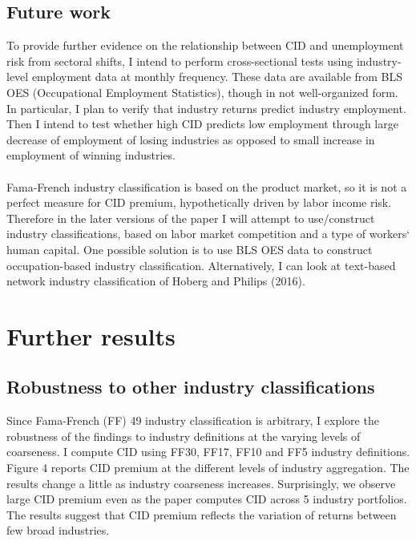 \documentclass[12pt]{article}
\begin{document}
\subsection{Future work}

To provide further evidence on the relationship between CID and unemployment risk from sectoral shifts, I intend to perform cross-sectional tests using industry-level employment data at monthly frequency. These data are available from BLS OES (Occupational Employment Statistics), though in not well-organized form. In particular, I plan to verify that industry returns predict industry employment. Then I intend to test whether high CID predicts low employment through large decrease of employment of losing industries as opposed to small increase in employment of winning industries.
\paragraph{}
Fama-French industry classification is based on the product market, so it is not a perfect measure for CID premium, hypothetically driven by labor income risk. Therefore in the later versions of the paper I will attempt to use/construct industry classifications, based on labor market competition and a type of workers` human capital. One possible solution is to use BLS OES data to construct occupation-based industry classification. Alternatively, I can look at text-based network industry classification of Hoberg and Philips (2016).


\section{Further results} \label{sec:Model}
\subsection{Robustness to other industry classifications}

Since Fama-French (FF) 49 industry classification is arbitrary, I explore the robustness of the findings to industry definitions at the varying levels of coarseness. I compute CID using FF30, FF17, FF10 and FF5 industry definitions. Figure 4 reports CID premium at the different levels of industry aggregation. The results change a little as industry coarseness increases. Surprisingly, we observe large CID premium even as the paper computes CID across 5 industry portfolios. The results suggest that CID premium reflects the variation of returns between few broad industries. 
\end{document}
